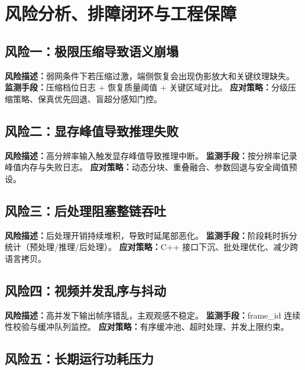 \documentclass[12pt,a4paper]{ctexart}
\begin{document}
\section{风险分析、排障闭环与工程保障}

\subsection{风险一：极限压缩导致语义崩塌}

\textbf{风险描述：}弱网条件下若压缩过激，端侧恢复会出现伪影放大和关键纹理缺失。\newline
\textbf{监测手段：}压缩档位日志 + 恢复质量阈值 + 关键区域对比。\newline
\textbf{应对策略：}分级压缩策略、保真优先回退、盲超分感知门控。

\subsection{风险二：显存峰值导致推理失败}

\textbf{风险描述：}高分辨率输入触发显存峰值导致推理中断。\newline
\textbf{监测手段：}按分辨率记录峰值内存与失败日志。\newline
\textbf{应对策略：}动态分块、重叠融合、参数回退与安全阈值预设。

\subsection{风险三：后处理阻塞整链吞吐}

\textbf{风险描述：}后处理开销持续堆积，导致时延尾部恶化。\newline
\textbf{监测手段：}阶段耗时拆分统计（预处理/推理/后处理）。\newline
\textbf{应对策略：}C++ 接口下沉、批处理优化、减少跨语言拷贝。

\subsection{风险四：视频并发乱序与抖动}

\textbf{风险描述：}高并发下输出帧序错乱，主观观感不稳定。\newline
\textbf{监测手段：}frame\_id 连续性校验与缓冲队列监控。\newline
\textbf{应对策略：}有序缓冲池、超时处理、并发上限约束。

\subsection{风险五：长期运行功耗压力}
\end{document}
